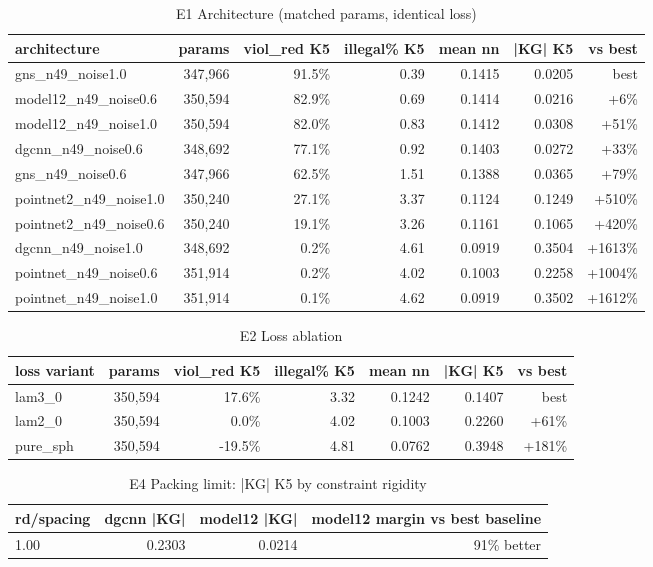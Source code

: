 \begin{table}[t]
\centering
\begin{tabular}{lrrrrrr}
\hline
architecture & params & viol_red K5 & illegal\% K5 & mean nn & |KG| K5 & vs best \\
\hline
gns_n49_noise1.0 & 347,966 & 91.5\% & 0.39 & 0.1415 & 0.0205 & best \\
model12_n49_noise0.6 & 350,594 & 82.9\% & 0.69 & 0.1414 & 0.0216 & +6\% \\
model12_n49_noise1.0 & 350,594 & 82.0\% & 0.83 & 0.1412 & 0.0308 & +51\% \\
dgcnn_n49_noise0.6 & 348,692 & 77.1\% & 0.92 & 0.1403 & 0.0272 & +33\% \\
gns_n49_noise0.6 & 347,966 & 62.5\% & 1.51 & 0.1388 & 0.0365 & +79\% \\
pointnet2_n49_noise1.0 & 350,240 & 27.1\% & 3.37 & 0.1124 & 0.1249 & +510\% \\
pointnet2_n49_noise0.6 & 350,240 & 19.1\% & 3.26 & 0.1161 & 0.1065 & +420\% \\
dgcnn_n49_noise1.0 & 348,692 & 0.2\% & 4.61 & 0.0919 & 0.3504 & +1613\% \\
pointnet_n49_noise0.6 & 351,914 & 0.2\% & 4.02 & 0.1003 & 0.2258 & +1004\% \\
pointnet_n49_noise1.0 & 351,914 & 0.1\% & 4.62 & 0.0919 & 0.3502 & +1612\% \\
\hline
\end{tabular}
\caption{E1 Architecture (matched params, identical loss)}
\label{tab:e1}
\end{table}

\begin{table}[t]
\centering
\begin{tabular}{lrrrrrr}
\hline
loss variant & params & viol_red K5 & illegal\% K5 & mean nn & |KG| K5 & vs best \\
\hline
lam3_0 & 350,594 & 17.6\% & 3.32 & 0.1242 & 0.1407 & best \\
lam2_0 & 350,594 & 0.0\% & 4.02 & 0.1003 & 0.2260 & +61\% \\
pure_sph & 350,594 & -19.5\% & 4.81 & 0.0762 & 0.3948 & +181\% \\
\hline
\end{tabular}
\caption{E2 Loss ablation}
\label{tab:e2}
\end{table}

\begin{table}[t]
\centering
\begin{tabular}{lrrr}
\hline
rd/spacing & dgcnn |KG| & model12 |KG| & model12 margin vs best baseline \\
\hline
1.00 & 0.2303 & 0.0214 & 91\% better \\
\hline
\end{tabular}
\caption{E4 Packing limit: |KG| K5 by constraint rigidity}
\label{tab:e4}
\end{table}

